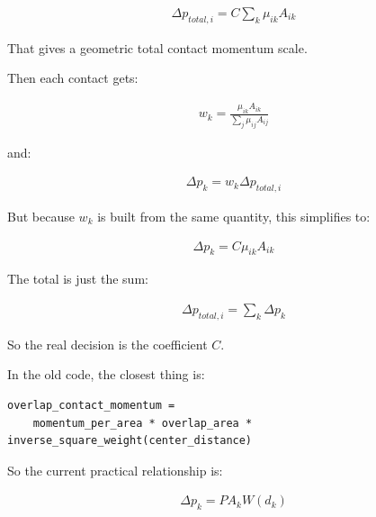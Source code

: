 \begin{equation}
\begin{aligned}
\label{none}
\Delta p_{total,i}= C \sum_k \mu_{ik} A_{ik}
\end{aligned}
\end{equation}

That gives a geometric total contact momentum scale.

Then each contact gets:

\begin{equation}
\begin{aligned}
\label{none}
w_k =
\frac{\mu_{ik} A_{ik}}
{\sum_j \mu_{ij} A_{ij}}
\end{aligned}
\end{equation}

and:

\begin{equation}
\begin{aligned}
\label{none}
\Delta p_k = w_k \Delta p_{total,i}
\end{aligned}
\end{equation}

But because $w_k$ is built from the same quantity, this simplifies to:


\begin{equation}
\begin{aligned}
\label{none}
\Delta p_k = C \mu_{ik} A_{ik}
\end{aligned}
\end{equation}

The total is just the sum:

\begin{equation}
\begin{aligned}
\label{none}
\Delta p_{total,i}=\sum_k \Delta p_k
\end{aligned}
\end{equation}

So the real decision is the coefficient $C$.

In the old code, the closest thing is:
\begin{verbatim}
overlap_contact_momentum =
    momentum_per_area * overlap_area * inverse_square_weight(center_distance)
\end{verbatim}
So the current practical relationship is:

\begin{equation}
\begin{aligned}
\label{none}
\Delta p_k=P A_k W(d_k)
\end{aligned}
\end{equation}

